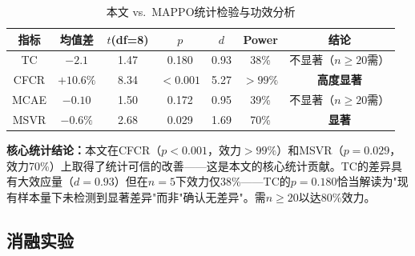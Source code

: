 \documentclass[12pt,a4paper,UTF8]{ctexart}
\begin{document}
\begin{table}[H]
    \centering
    \caption{本文 vs.\ MAPPO统计检验与功效分析}
    \label{tab:ttest}
    \begin{tabular}{|c|c|c|c|c|c|c|}
        \hline
        \textbf{指标} & \textbf{均值差} & \textbf{$t$(df=8)} & \textbf{$p$} & \textbf{$d$} & \textbf{Power} & \textbf{结论} \\
        \hline
        TC & $-2.1$ & 1.47 & 0.180 & 0.93 & 38\% & 不显著（$n\geq20$需） \\
        CFCR & $+10.6\%$ & 8.34 & $<0.001$ & 5.27 & $>99\%$ & \textbf{高度显著} \\
        MCAE & $-0.10$ & 1.50 & 0.172 & 0.95 & 39\% & 不显著（$n\geq20$需） \\
        MSVR & $-0.6\%$ & 2.68 & 0.029 & 1.69 & 70\% & \textbf{显著} \\
        \hline
    \end{tabular}
\end{table}

\textbf{核心统计结论：}本文在CFCR（$p<0.001$，效力$>99\%$）和MSVR（$p=0.029$，效力70\%）上取得了统计可信的改善——这是本文的核心统计贡献。TC的差异具有大效应量（$d=0.93$）但在$n=5$下效力仅38\%——TC的$p=0.180$恰当解读为"现有样本量下未检测到显著差异"而非"确认无差异"。需$n\geq20$以达80\%效力。

\subsection{消融实验}

\begin{table}[H]
    \centering
    \caption{消融实验（$n=5$）}
    \label{tab:ablation}
\end{table}
\end{document}
